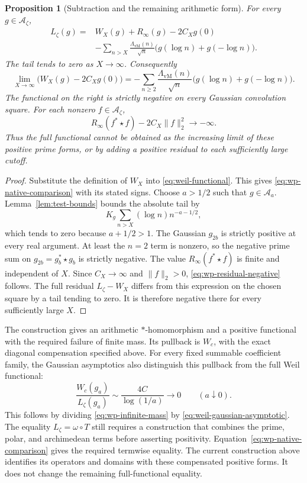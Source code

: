 \documentclass[11pt]{article}
\newtheorem{proposition}[theorem]{Proposition}
\theoremstyle{definition}
\theoremstyle{remark}
\numberwithin{equation}{section}
\newcommand{\cA}{\mathcal A}
\begin{document}
\begin{proposition}[Subtraction and the remaining arithmetic form]
\label{prop:wp-native-comparison}
For every $g\in\cA_\zeta$,
\begin{equation}
 \begin{split}
 L_\zeta(g)={}&W_X(g)+R_\infty(g)-2C_Xg(0)\\
 &-\sum_{n>X}\frac{\Lambda_{\mathrm{vM}}(n)}{\sqrt n}
                            \bigl(g(\log n)+g(-\log n)\bigr).
 \end{split}
 \label{eq:wp-native-comparison}
\end{equation}
The tail tends to zero as $X\to\infty$.
Consequently
\[
 \lim_{X\to\infty}\bigl(W_X(g)-2C_Xg(0)\bigr)
 =-\sum_{n\geq2}\frac{\Lambda_{\mathrm{vM}}(n)}{\sqrt n}
                            \bigl(g(\log n)+g(-\log n)\bigr).
\]
The functional on the right is strictly negative on every Gaussian
convolution square.
For each nonzero $f\in\cA_\zeta$,
\begin{equation}
 R_\infty(f^*\star f)-2C_X\|f\|_2^2\longrightarrow-\infty.
 \label{eq:wp-residual-negative}
\end{equation}
Thus the full functional cannot be obtained as the increasing limit of
these positive prime forms, or by adding a positive residual to each
sufficiently large cutoff.
\end{proposition}
\begin{proof}
Substitute the definition of $W_X$ into \eqref{eq:weil-functional}.
This gives \eqref{eq:wp-native-comparison} with its stated signs.
Choose $a>1/2$ such that $g\in\mathcal A_a$.
Lemma~\ref{lem:test-bounds} bounds the absolute tail by
\[
 K_g\sum_{n>X}(\log n)n^{-a-1/2},
\]
which tends to zero because $a+1/2>1$.
The Gaussian $g_{2b}$ is strictly positive at every real argument.
At least the $n=2$ term is nonzero, so the negative prime sum on
$g_{2b}=g_b^*\star g_b$ is strictly negative.
The value $R_\infty(f^*\star f)$ is finite and independent of $X$.
Since $C_X\to\infty$ and $\|f\|_2>0$,
\eqref{eq:wp-residual-negative} follows.
The full residual $L_\zeta-W_X$ differs from this expression on the
chosen square by a tail tending to zero.
It is therefore negative there for every sufficiently large $X$.
\end{proof}

The construction gives an arithmetic $*$-homomorphism and a positive
functional with the required failure of finite mass.
Its pullback is $W_c$, with the exact diagonal compensation specified above.
For every fixed summable coefficient family, the Gaussian asymptotics
also distinguish this pullback from the full Weil functional:
\[
 \frac{W_c(g_a)}{L_\zeta(g_a)}
 \sim\frac{4C}{\log(1/a)}\longrightarrow0
 \qquad(a\downarrow0).
\]
This follows by dividing \eqref{eq:wp-infinite-mass} by
\eqref{eq:weil-gaussian-asymptotic}.
The equality $L_\zeta=\omega\circ T$ still requires a construction that
combines the prime, polar, and archimedean terms before asserting positivity.
Equation~\eqref{eq:wp-native-comparison} gives the required termwise equality.
The current construction above identifies its operators and domains
with these compensated positive forms.  It does not change the remaining
full-functional equality.
\end{document}
